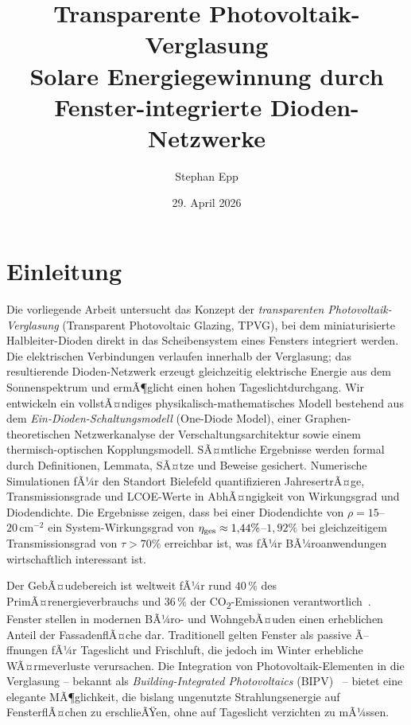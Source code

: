 ﻿\documentclass[a4paper,12pt]{article}
\title{%
  {\bfseries Transparente Photovoltaik-Verglasung}\\[-0.1em]
  {\large Solare Energiegewinnung durch Fenster-integrierte Dioden-Netzwerke}}
\author{Stephan Epp}
\date{29. April 2026}
\theoremstyle{definition}
\theoremstyle{remark}
\begin{document}

\maketitle
\tableofcontents
\newpage

\section{Einleitung}
\label{sec:einleitung}
Die vorliegende Arbeit untersucht das Konzept der \emph{transparenten
Photovoltaik-Verglasung} (Transparent Photovoltaic Glazing, TPVG), bei dem
miniaturisierte Halbleiter-Dioden direkt in das Scheibensystem eines Fensters
integriert werden. Die elektrischen Verbindungen verlaufen innerhalb der
Verglasung; das resultierende Dioden-Netzwerk erzeugt gleichzeitig elektrische
Energie aus dem Sonnenspektrum und ermÃ¶glicht einen hohen Tageslichtdurchgang.
Wir entwickeln ein vollstÃ¤ndiges physikalisch-mathematisches Modell bestehend
aus dem \emph{Ein-Dioden-Schaltungsmodell} (One-Diode Model), einer
Graphen-theoretischen Netzwerkanalyse der Verschaltungsarchitektur sowie einem
thermisch-optischen Kopplungsmodell. SÃ¤mtliche Ergebnisse werden formal durch
Definitionen, Lemmata, SÃ¤tze und Beweise gesichert. Numerische Simulationen fÃ¼r
den Standort Bielefeld quantifizieren JahresertrÃ¤ge, Transmissionsgrade und
LCOE-Werte in AbhÃ¤ngigkeit von Wirkungsgrad und Diodendichte. Die Ergebnisse
zeigen, dass bei einer Diodendichte von $\rho = 15$--$20\,\text{cm}^{-2}$ ein
System-Wirkungsgrad von $\eta_{\rm ges} \approx 1{,}44\%$--$1{,}92\%$ bei
gleichzeitigem Transmissionsgrad von $\tau > 70\%$ erreichbar ist, was fÃ¼r
BÃ¼roanwendungen wirtschaftlich interessant ist.

Der GebÃ¤udebereich ist weltweit fÃ¼r rund $40\,\%$ des PrimÃ¤renergieverbrauchs
und $36\,\%$ der CO\textsubscript{2}-Emissionen verantwortlich~\cite{IEA2023}. Fenster
stellen in modernen BÃ¼ro- und WohngebÃ¤uden einen erheblichen Anteil der
FassadenflÃ¤che dar. Traditionell gelten Fenster als passive Ã–ffnungen fÃ¼r
Tageslicht und Frischluft, die jedoch im Winter erhebliche WÃ¤rmeverluste
verursachen. Die Integration von Photovoltaik-Elementen in die Verglasung --
bekannt als \emph{Building-Integrated Photovoltaics} (BIPV)~\cite{Shukla2017}
-- bietet eine elegante MÃ¶glichkeit, die bislang ungenutzte Strahlungsenergie
auf FensterflÃ¤chen zu erschlieÃŸen, ohne auf Tageslicht verzichten zu mÃ¼ssen.
\end{document}

